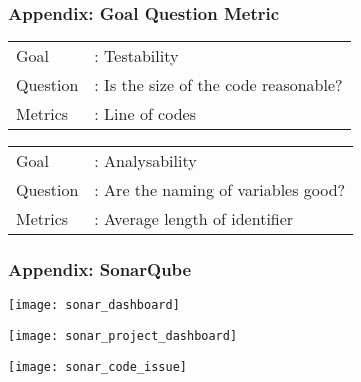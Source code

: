 \begin{frame}
\label{appendix:goal_question_metric}
\frametitle{Appendix: Goal Question Metric}

\begin{example}
\begin{tabular}{ l l }
Goal &: Testability \\
Question &: Is the size of the code reasonable? \\
Metrics &: Line of codes\\
\end{tabular}
\end{example}

\begin{example}
\begin{tabular}{ l l }
Goal &: Analysability \\
Question &: Are the naming of variables good? \\
Metrics &: Average length of identifier\\
\end{tabular}
\end{example}

\hyperlink{subsection:goal_question_metric}{}

\end{frame}

\begin{frame}[allowframebreaks]
\label{appendix:sonar_qube}
\frametitle{Appendix: SonarQube}

\begin{center}
\texttt{[image: sonar\_dashboard]}
\end{center}
\hyperlink{subsection:sonar_qube}{}

\framebreak

\begin{center}
\texttt{[image: sonar\_project\_dashboard]}
\end{center}

\hyperlink{subsection:sonar_qube}{}

\framebreak

\begin{center}
\texttt{[image: sonar\_code\_issue]}
\end{center}

\hyperlink{subsection:sonar_qube}{}
\end{frame}

